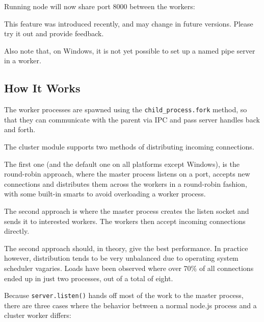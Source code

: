 Running node will now share port 8000 between the workers:

\begin{Shaded}
\end{Shaded}

This feature was introduced recently, and may change in future versions.
Please try it out and provide feedback.

Also note that, on Windows, it is not yet possible to set up a named
pipe server in a worker.

\subsection{How It Works}\label{how-it-works}

The worker processes are spawned using the \texttt{child\_process.fork}
method, so that they can communicate with the parent via IPC and pass
server handles back and forth.

The cluster module supports two methods of distributing incoming
connections.

The first one (and the default one on all platforms except Windows), is
the round-robin approach, where the master process listens on a port,
accepts new connections and distributes them across the workers in a
round-robin fashion, with some built-in smarts to avoid overloading a
worker process.

The second approach is where the master process creates the listen
socket and sends it to interested workers. The workers then accept
incoming connections directly.

The second approach should, in theory, give the best performance. In
practice however, distribution tends to be very unbalanced due to
operating system scheduler vagaries. Loads have been observed where over
70\% of all connections ended up in just two processes, out of a total
of eight.

Because \texttt{server.listen()} hands off most of the work to the
master process, there are three cases where the behavior between a
normal node.js process and a cluster worker differs:

